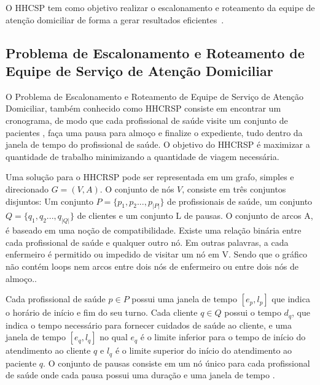O \ac{HHCSP} tem como objetivo realizar o escalonamento e roteamento da equipe de atenção domiciliar de forma a gerar resultados eficientes~\cite{bachouch:2010}.


\subsection{Problema de Escalonamento e Roteamento de Equipe de Serviço de Atenção Domiciliar}

O Problema de Escalonamento e Roteamento de Equipe de Serviço de Atenção Domiciliar, também conhecido como \ac{HHCRSP} consiste em  encontrar um cronograma, de modo que cada profissional de saúde visite um conjunto de pacientes , faça uma pausa para almoço e finalize o expediente, tudo dentro da janela de tempo do profissional de saúde. O objetivo do \ac{HHCRSP} é maximizar a quantidade de trabalho minimizando a quantidade de viagem necessária. \cite{cheng:98}

Uma solução para o \ac{HHCRSP} pode ser representada em um grafo, simples e direcionado $G = (V,A)$. O conjunto de nós $V$, consiste em três conjuntos disjuntos: Um conjunto $P = \{ p_1, p_2 ..., p_{|P|} \}$ de profissionais de saúde, um conjunto $Q = \{ q_1, q_2 ..., q_{|Q|} \}$ de clientes e um conjunto L de pausas. O conjunto de arcos A, é baseado em uma noção de compatibilidade. Existe uma relação binária entre cada profissional de saúde e qualquer outro nó. Em outras palavras, a cada enfermeiro é permitido ou impedido de visitar um nó em V. Sendo que o gráfico não contém loops nem arcos entre dois nós de enfermeiro ou entre dois nós de almoço.\cite{cheng:98}. 

Cada profissional de saúde $p \in P$ possui uma janela de tempo $[e_p, l_p]$ que indica o horário de início e fim do seu turno. Cada cliente $q \in Q$ possui o tempo $d_q$, que indica o tempo necessário para fornecer cuidados de saúde ao cliente, e uma janela de tempo $[e_q,l_q]$ no qual $e_q$ é o limite inferior para o tempo de início do atendimento ao cliente $q$ e  $l_q$ é o limite superior do início do atendimento ao paciente $q$. O conjunto de pausas consiste em um nó único para cada profissional de saúde onde cada pausa possui uma duração e uma janela de tempo \cite{cheng:98}.